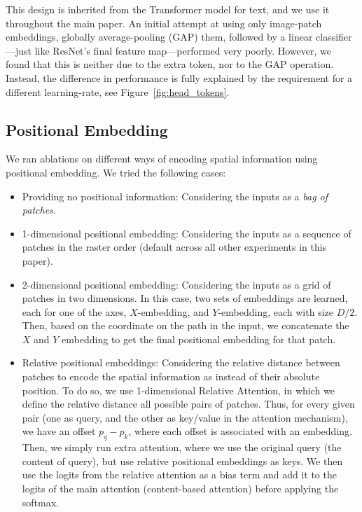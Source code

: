 This design is inherited from the Transformer model for text, and we use it throughout the main paper.
An initial attempt at using only image-patch embeddings, globally average-pooling (GAP) them, followed by a linear classifier---just like ResNet's final feature map---performed very poorly.
However, we found that this is neither due to the extra token, nor to the GAP operation. Instead, the difference in performance is fully explained by the requirement for a different learning-rate, see Figure~\ref{fig:head_tokens}.

\subsection{Positional Embedding}
\label{app:pos_emb}

We ran ablations on different ways of encoding spatial information using positional embedding. We tried the following cases:
\begin{itemize}
    \item Providing no positional information: Considering the inputs as a \emph{bag of patches}.
    \item 1-dimensional positional embedding: Considering the inputs as a sequence of patches in the raster order (default across all other experiments in this paper).
    \item 2-dimensional positional embedding: Considering the inputs as a grid of patches in two dimensions. In this case, two sets of embeddings are learned, each for one of the axes, $X$-embedding, and $Y$-embedding, each with size $D/2$. Then, based on the coordinate on the path in the input, we concatenate the $X$ and $Y$ embedding to get the final positional embedding for that patch.
    \item Relative positional embeddings:  Considering the relative distance between patches to encode the spatial information as instead of their absolute position. To do so, we use 1-dimensional Relative Attention, in which we define the relative distance all possible pairs of patches. Thus, for every given pair (one as query, and the other as key/value in the attention mechanism), we have an offset $p_{q}-p_{k}$, where each offset is associated with an embedding. Then, we simply run extra attention, where we use the original query (the content of query), but use relative positional embeddings as keys. We then use the logits from the relative attention as a bias term and add it to the logits of the main attention (content-based attention) before applying the softmax. 
\end{itemize}



